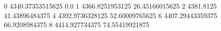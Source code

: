 0 4340.37353515625 0.0
1 4366.8251953125 26.45166015625
2 4381.8125 41.43896484375
4 4392.9736328125 52.60009765625
6 4407.29443359375 66.9208984375
8 4414.927734375 74.55419921875
